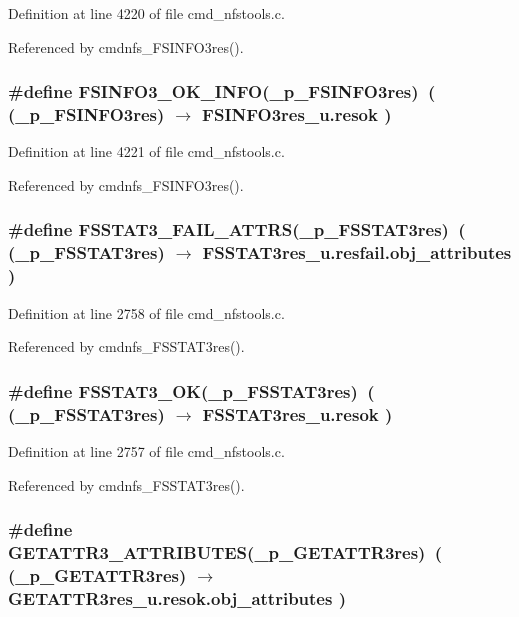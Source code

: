 Definition at line 4220 of file cmd\_\-nfstools.c.

Referenced by cmdnfs\_\-FSINFO3res().
\subsubsection{\setlength{\rightskip}{0pt plus 5cm}\#define FSINFO3\_\-OK\_\-INFO(\_\-p\_\-FSINFO3res)\ ( (\_\-p\_\-FSINFO3res) $\rightarrow$ FSINFO3res\_\-u.resok )}\label{cmd__nfstools_8c_a52}




Definition at line 4221 of file cmd\_\-nfstools.c.

Referenced by cmdnfs\_\-FSINFO3res().
\subsubsection{\setlength{\rightskip}{0pt plus 5cm}\#define FSSTAT3\_\-FAIL\_\-ATTRS(\_\-p\_\-FSSTAT3res)\ ( (\_\-p\_\-FSSTAT3res) $\rightarrow$ FSSTAT3res\_\-u.resfail.obj\_\-attributes )}\label{cmd__nfstools_8c_a21}




Definition at line 2758 of file cmd\_\-nfstools.c.

Referenced by cmdnfs\_\-FSSTAT3res().
\subsubsection{\setlength{\rightskip}{0pt plus 5cm}\#define FSSTAT3\_\-OK(\_\-p\_\-FSSTAT3res)\ ( (\_\-p\_\-FSSTAT3res) $\rightarrow$ FSSTAT3res\_\-u.resok )}\label{cmd__nfstools_8c_a20}




Definition at line 2757 of file cmd\_\-nfstools.c.

Referenced by cmdnfs\_\-FSSTAT3res().
\subsubsection{\setlength{\rightskip}{0pt plus 5cm}\#define GETATTR3\_\-ATTRIBUTES(\_\-p\_\-GETATTR3res)\ ( (\_\-p\_\-GETATTR3res) $\rightarrow$ GETATTR3res\_\-u.resok.obj\_\-attributes )}\label{cmd__nfstools_8c_a8}




